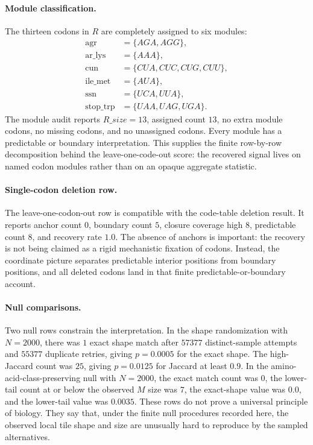\paragraph{Module classification.} The thirteen codons in $R$ are completely assigned to six modules:
$$
\begin{aligned}
\text{agr}&=\{AGA,AGG\},\\
\text{ar\_lys}&=\{AAA\},\\
\text{cun}&=\{CUA,CUC,CUG,CUU\},\\
\text{ile\_met}&=\{AUA\},\\
\text{ssn}&=\{UCA,UUA\},\\
\text{stop\_trp}&=\{UAA,UAG,UGA\}.
\end{aligned}
$$
The module audit reports $R\_size=13$, assigned count $13$, no extra module codons, no missing codons, and no unassigned codons. Every module has a predictable or boundary interpretation. This supplies the finite row-by-row decomposition behind the leave-one-code-out score: the recovered signal lives on named codon modules rather than on an opaque aggregate statistic.

\paragraph{Single-codon deletion row.} The leave-one-codon-out row is compatible with the code-table deletion result. It reports anchor count $0$, boundary count $5$, closure coverage high $8$, predictable count $8$, and recovery rate $1.0$. The absence of anchors is important: the recovery is not being claimed as a rigid mechanistic fixation of codons. Instead, the coordinate picture separates predictable interior positions from boundary positions, and all deleted codons land in that finite predictable-or-boundary account.

\paragraph{Null comparisons.} Two null rows constrain the interpretation. In the shape randomization with $N=2000$, there was $1$ exact shape match after $57377$ distinct-sample attempts and $55377$ duplicate retries, giving $p=0.0005$ for the exact shape. The high-Jaccard count was $25$, giving $p=0.0125$ for Jaccard at least $0.9$. In the amino-acid-class-preserving null with $N=2000$, the exact match count was $0$, the lower-tail count at or below the observed $M$ size was $7$, the exact-shape value was $0.0$, and the lower-tail value was $0.0035$. These rows do not prove a universal principle of biology. They say that, under the finite null procedures recorded here, the observed local tile shape and size are unusually hard to reproduce by the sampled alternatives.

